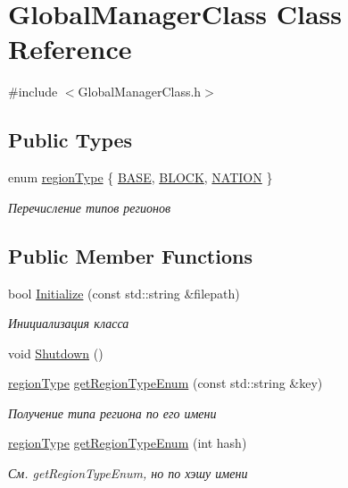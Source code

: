 \hypertarget{class_global_manager_class}{}\section{Global\+Manager\+Class Class Reference}
\label{class_global_manager_class}


{\ttfamily \#include $<$Global\+Manager\+Class.\+h$>$}

\subsection*{Public Types}
\begin{DoxyCompactItemize}
\item 
enum \hyperlink{class_global_manager_class_a794b4a5298c61f8d25d9da44b7826857}{region\+Type} \{ \hyperlink{class_global_manager_class_a794b4a5298c61f8d25d9da44b7826857a41b5d37bbfd4db9465ccfaf325022c7d}{B\+A\+SE}, 
\hyperlink{class_global_manager_class_a794b4a5298c61f8d25d9da44b7826857ab6be4db5874098d50d90b6c92b94e4d1}{B\+L\+O\+CK}, 
\hyperlink{class_global_manager_class_a794b4a5298c61f8d25d9da44b7826857a9b63cc0bb1183fdcdb934d6ab7942281}{N\+A\+T\+I\+ON}
 \}\begin{DoxyCompactList}\small\item\em Перечисление типов регионов \end{DoxyCompactList}
\end{DoxyCompactItemize}
\subsection*{Public Member Functions}
\begin{DoxyCompactItemize}
\item 
bool \hyperlink{class_global_manager_class_a6d85d6cbc5f93b995490d4ebe360245f}{Initialize} (const std\+::string \&filepath)
\begin{DoxyCompactList}\small\item\em Инициализация класса \end{DoxyCompactList}\item 
void \hyperlink{class_global_manager_class_ab30c674b518f12864de7b7a20a7de0f8}{Shutdown} ()
\item 
\hyperlink{class_global_manager_class_a794b4a5298c61f8d25d9da44b7826857}{region\+Type} \hyperlink{class_global_manager_class_a882a8b1b96ed1f1210dd8faef5d305c9}{get\+Region\+Type\+Enum} (const std\+::string \&key)
\begin{DoxyCompactList}\small\item\em Получение типа региона по его имени \end{DoxyCompactList}\item 
\hyperlink{class_global_manager_class_a794b4a5298c61f8d25d9da44b7826857}{region\+Type} \hyperlink{class_global_manager_class_a4bf547b9b24567fbc3452a9ab4a86f11}{get\+Region\+Type\+Enum} (int hash)
\begin{DoxyCompactList}\small\item\em См. get\+Region\+Type\+Enum, но по хэшу имени \end{DoxyCompactList}\end{DoxyCompactItemize}
